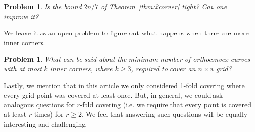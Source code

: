 \documentclass[
final
]{dmtcs-episciences}
\numberwithin{equation}{subsection}
\newtheorem{prob}[defn]{Problem}%
\newcommand{\remove}[1]{}
\begin{document}
\begin{prob}
	Is the bound $2n/7$ of Theorem~\ref{thm:2corner} tight? Can one improve it?
\end{prob}
We leave it as an open problem to figure out what happens when there are more inner corners.
\begin{prob}
	What can be said about the minimum number of orthoconvex curves with at most $k$ inner corners, where $k\geq 3$, required to cover an $n\times n$ grid?
\end{prob}
\remove{ Next we looked at covering by non-congruent curves, where we were able to apply results and ideas from incidence geometry. Here we made a conjectural statement on covering by circles of different radii, which came as a consequence of the conjectured bounds on the number of point-circle incidences. Finally, we considered covering by ``small'' curves, i.e. curves with a constant number of grid points. A key ingredient that was used here was the existence of a tiling of $\mathbb{Z}^2$ by translates of these curves. An interesting question that could be asked here is: For which small curves do such tiling exists? Note that, existence of such tiling will give us the minimum number of such curves required to cover an $n\times n$ grid.} Lastly, we mention that in this article we only considered 1-fold covering where every grid point was covered at least once. But, in general, we could ask analogous questions for $r$-fold covering (i.e. we require that every point is covered at least $r$ times) for $r\geq 2$. We feel that answering such questions will be equally interesting and challenging.

\remove{An extended version of this work, with some additional results, has been uploaded to arXiv~\cite{arxiv}, which the interested readers are welcome to have a look.}





%


%

\label{sec:biblio}
\end{document}
